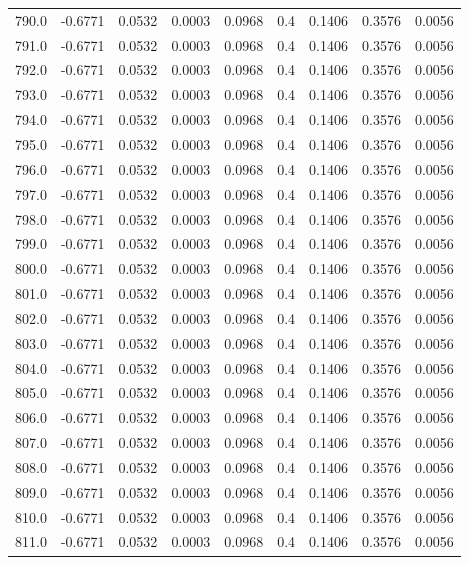 \begin{longtable}{lrrrrrrrr}
790.0 & -0.6771 & 0.0532 & 0.0003 & 0.0968 & 0.4 & 0.1406 & 0.3576 & 0.0056 \\
791.0 & -0.6771 & 0.0532 & 0.0003 & 0.0968 & 0.4 & 0.1406 & 0.3576 & 0.0056 \\
792.0 & -0.6771 & 0.0532 & 0.0003 & 0.0968 & 0.4 & 0.1406 & 0.3576 & 0.0056 \\
793.0 & -0.6771 & 0.0532 & 0.0003 & 0.0968 & 0.4 & 0.1406 & 0.3576 & 0.0056 \\
794.0 & -0.6771 & 0.0532 & 0.0003 & 0.0968 & 0.4 & 0.1406 & 0.3576 & 0.0056 \\
795.0 & -0.6771 & 0.0532 & 0.0003 & 0.0968 & 0.4 & 0.1406 & 0.3576 & 0.0056 \\
796.0 & -0.6771 & 0.0532 & 0.0003 & 0.0968 & 0.4 & 0.1406 & 0.3576 & 0.0056 \\
797.0 & -0.6771 & 0.0532 & 0.0003 & 0.0968 & 0.4 & 0.1406 & 0.3576 & 0.0056 \\
798.0 & -0.6771 & 0.0532 & 0.0003 & 0.0968 & 0.4 & 0.1406 & 0.3576 & 0.0056 \\
799.0 & -0.6771 & 0.0532 & 0.0003 & 0.0968 & 0.4 & 0.1406 & 0.3576 & 0.0056 \\
800.0 & -0.6771 & 0.0532 & 0.0003 & 0.0968 & 0.4 & 0.1406 & 0.3576 & 0.0056 \\
801.0 & -0.6771 & 0.0532 & 0.0003 & 0.0968 & 0.4 & 0.1406 & 0.3576 & 0.0056 \\
802.0 & -0.6771 & 0.0532 & 0.0003 & 0.0968 & 0.4 & 0.1406 & 0.3576 & 0.0056 \\
803.0 & -0.6771 & 0.0532 & 0.0003 & 0.0968 & 0.4 & 0.1406 & 0.3576 & 0.0056 \\
804.0 & -0.6771 & 0.0532 & 0.0003 & 0.0968 & 0.4 & 0.1406 & 0.3576 & 0.0056 \\
805.0 & -0.6771 & 0.0532 & 0.0003 & 0.0968 & 0.4 & 0.1406 & 0.3576 & 0.0056 \\
806.0 & -0.6771 & 0.0532 & 0.0003 & 0.0968 & 0.4 & 0.1406 & 0.3576 & 0.0056 \\
807.0 & -0.6771 & 0.0532 & 0.0003 & 0.0968 & 0.4 & 0.1406 & 0.3576 & 0.0056 \\
808.0 & -0.6771 & 0.0532 & 0.0003 & 0.0968 & 0.4 & 0.1406 & 0.3576 & 0.0056 \\
809.0 & -0.6771 & 0.0532 & 0.0003 & 0.0968 & 0.4 & 0.1406 & 0.3576 & 0.0056 \\
810.0 & -0.6771 & 0.0532 & 0.0003 & 0.0968 & 0.4 & 0.1406 & 0.3576 & 0.0056 \\
811.0 & -0.6771 & 0.0532 & 0.0003 & 0.0968 & 0.4 & 0.1406 & 0.3576 & 0.0056 \\

\end{longtable}
